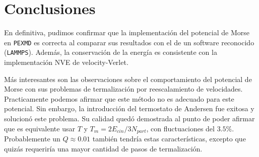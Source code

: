 \documentclass[twoside, 12pt]{article}
\begin{document}

\section{Conclusiones}

En definitiva, pudimos confirmar que la implementación del potencial de Morse en \texttt{PEXMD} es correcta al comparar sus resultados con el de un software reconocido (\texttt{LAMMPS}).
Además, la conservación de la energía es consistente con la implementación NVE de velocity-Verlet.

Más interesantes son las observaciones sobre el comportamiento del potencial de Morse con sus problemas de termalización por reescalamiento de velocidades. 
Practicamente podemos afirmar que este método no es adecuado para este potencial. Sin embargo, la introducción del termostato de Andersen fue exitosa y solucionó este problema.
Su calidad quedó demostrada al punto de poder afirmar que es equivalente usar $T$ y $T_m = 2E_{cin}/3N_{part}$, con fluctuaciones del $3.5\%$. 
Probablemente un $Q\approx0.01$ también tendría estas características, excepto que quizás requeriría una mayor cantidad de pasos de termalización. 
\end{document}
